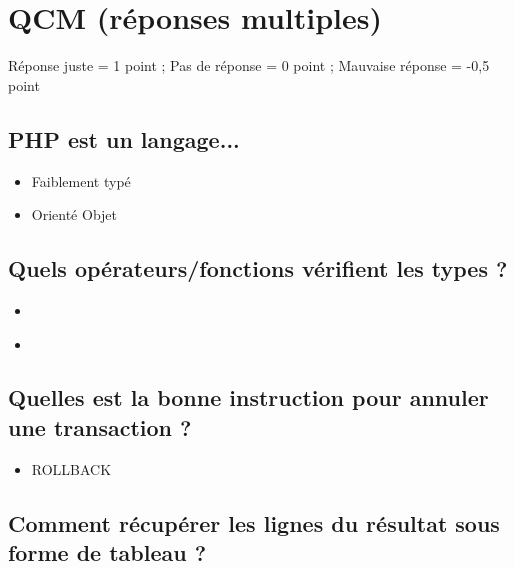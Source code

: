 \documentclass[11pt,a4paper]{article}
\begin{document}
\MakeExamTitle                   %


\section{QCM (réponses multiples)}

\medskip

Réponse juste = 1 point ; Pas de réponse = 0 point ; Mauvaise réponse = -0,5 point

\medskip

\subsection{PHP est un langage...}

\begin{itemize}
\item[\CaseCoche] Faiblement typé\\
\item[\CaseCoche] Orienté Objet\\
\end{itemize}


\subsection{Quels opérateurs/fonctions vérifient les types ?}

\begin{itemize}
\item[\CaseCoche]  \\
\item[\CaseCoche]  \\
\end{itemize}


\subsection{Quelles est la bonne instruction pour annuler une transaction ?}

\begin{itemize}
\item[\CaseCoche] ROLLBACK \\
\end{itemize}


\subsection{Comment récupérer les lignes du résultat sous forme de tableau ?}
\end{document}
